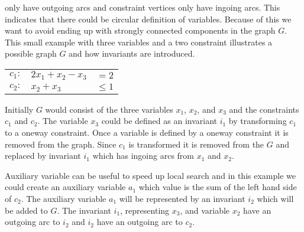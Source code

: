 only have outgoing arcs and constraint vertices only have ingoing arcs. This indicates that there could be circular 
definition of variables. Because of this we want to avoid ending up with strongly connected components in the graph 
$G$. \medskip \\ 
This small example with three variables and a two constraint illustrates a possible graph $G$ and how invariants are 
introduced. 
\begin{center}
\begin{tabular}{rlr}
$ c_1: $&$2x_1 + x_2 - x_3 $&$= 2$ \\
$ c_2: $&$x_2 + x_3 $&$\leq 1$ \\
\end{tabular} 
\end{center}
Initially $G$ would consist of the three variables $x_1$, $x_2$, and $x_3$ and the constraints $c_1$ and $c_2$. The 
variable $x_3$ could be defined as an invariant $i_1$ by transforming $c_1$ to a oneway constraint. Once a 
variable is defined by a oneway constraint it is removed from the graph. Since $c_1$ is transformed it is removed from 
the $G$ and replaced by invariant $i_1$ which has ingoing arcs from $x_1$ and $x_2$. 

\begin{center}
\end{center}
Auxiliary variable can be useful to speed up local search and in this example we could create an auxiliary 
variable $a_1$ which value is the sum of the left hand side of $c_2$. The auxiliary variable $a_1$ will be represented 
by an invariant $i_2$ which will be added to $G$. The invariant $i_1$, representing $x_3$, and variable $x_2$ have 
an outgoing arc to $i_2$ and $i_2$ have an outgoing arc to $c_2$. 


\begin{center}
\end{center}

